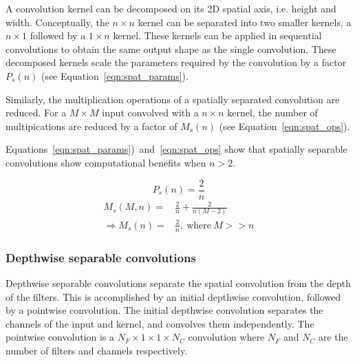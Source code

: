 \documentclass{article}
\begin{document}
	
	A convolution kernel can be decomposed on its 2D spatial axis, i.e. height and width. Conceptually, the $n \times n$ kernel can be separated into two smaller kernels, a $n \times 1$ followed by a $1 \times n$ kernel. These kernels can be applied in sequential convolutions to obtain the same output shape as the single convolution. These decomposed kernels scale the parameters required by the convolution by a factor $P_s(n)$ (see Equation~\ref{eqn:spat_params}). 
	
	Similarly, the multiplication operations of a spatially separated convolution are reduced. For a $M \times M$ input convolved with a $n \times n$ kernel, the number of multipications are reduced by a factor of $M_s(n)$ (see Equation~\ref{eqn:spat_ops}). 
	
	Equations~\ref{eqn:spat_params})~and~\ref{eqn:spat_ops} show that spatially separable convolutions show computational benefits when $n > 2$. 
	
	\begin{multicols}{2}
		\begin{equation}\label{eqn:spat_params}
			P_s(n) = \frac{2}{n}
		\end{equation}
	\break
		\begin{equation}\label{eqn:spat_ops}
			\begin{split}
				M_s(M, n) = & \frac{2}{n} + \frac{2}{n(M-2)} \\
				\Rightarrow M_s(n) = & \frac{2}{n},~\text{where}~M >> n
			\end{split}
		\end{equation}		
	\end{multicols}
	
	\subsubsection{Depthwise separable convolutions}	
	
	Depthwise separable convolutions separate the spatial convolution from the depth of the filters. This is accomplished by an initial depthwise convolution, followed by a pointwise convolution. The initial depthwise convolution separates the channels of the input and kernel, and convolves them independently. The pointwise convolution is a $N_F \times 1 \times 1 \times N_C$ convolution where $N_F$ and $N_C$ are the number of filters and channels respectively. 
	
\end{document}
